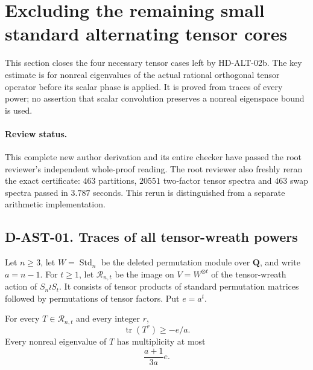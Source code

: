\section{Excluding the remaining small standard alternating tensor cores}
\label{sec:alternating-standard-tensors}

This section closes the four necessary tensor cases left by
HD-ALT-02b.  The key estimate is for nonreal eigenvalues of the
actual rational orthogonal tensor operator before its scalar
phase is applied.  It is proved from traces of every power;
no assertion that scalar convolution preserves a nonreal
eigenspace bound is used.

\paragraph{Review status.}
This complete new author derivation and its entire checker have
passed the root reviewer's independent whole-proof reading.
The root reviewer also freshly reran the exact certificate:
$463$ partitions, $20551$ two-factor tensor spectra and $463$
swap spectra passed in $3.787$ seconds.  This rerun is
distinguished from a separate arithmetic implementation.

\subsection*{D-AST-01. Traces of all tensor-wreath powers}

Let $n\ge3$, let $W=\operatorname{Std}_n$ be the deleted
permutation module over $\mathbf Q$, and write $a=n-1$.
For $t\ge1$, let $\mathcal R_{n,t}$ be the image on
$V=W^{\otimes t}$ of the tensor-wreath action of
$S_n\wr S_t$.  It consists of tensor products of standard
permutation matrices followed by permutations of tensor
factors.  Put $e=a^t$.

\begin{lemma}
\label{D-AST-01}
For every $T\in\mathcal R_{n,t}$ and every integer $r$,
\[
                         \operatorname{tr}(T^r)\ge-e/a.
                                                               \tag{AST.1}
\]
Every nonreal eigenvalue of $T$ has multiplicity at most
\[
                              \frac{a+1}{3a}e.             \tag{AST.2}
\]
\end{lemma}


